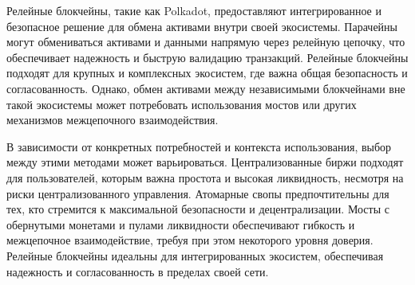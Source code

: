 Релейные блокчейны, такие как Polkadot, предоставляют интегрированное и безопасное решение для обмена активами внутри своей экосистемы. Парачейны могут обмениваться активами и данными напрямую через релейную цепочку, что обеспечивает надежность и быструю валидацию транзакций. Релейные блокчейны подходят для крупных и комплексных экосистем, где важна общая безопасность и согласованность. Однако, обмен активами между независимыми блокчейнами вне такой экосистемы может потребовать использования мостов или других механизмов межцепочного взаимодействия.

В зависимости от конкретных потребностей и контекста использования, выбор между этими методами может варьироваться. Централизованные биржи подходят для пользователей, которым важна простота и высокая ликвидность, несмотря на риски централизованного управления. Атомарные свопы предпочтительны для тех, кто стремится к максимальной безопасности и децентрализации. Мосты с обернутыми монетами и пулами ликвидности обеспечивают гибкость и межцепочное взаимодействие, требуя при этом некоторого уровня доверия. Релейные блокчейны идеальны для интегрированных экосистем, обеспечивая надежность и согласованность в пределах своей сети.
